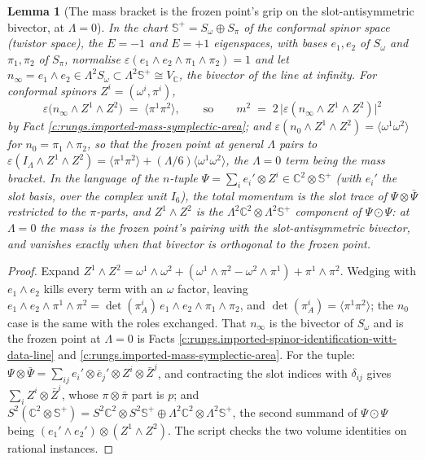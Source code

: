 \documentclass[11pt]{article}
\newtheorem{lemma}[theorem]{Lemma}
\theoremstyle{definition}
\theoremstyle{plain}
\providecommand{\C}{}\renewcommand{\C}{\mathbb{C}}
\providecommand{\CS}{}\renewcommand{\CS}{{\mathbb{S}^{+}}}
\providecommand{\Som}{}\renewcommand{\Som}{S_\omega}
\providecommand{\Spi}{}\renewcommand{\Spi}{S_\pi}
\providecommand{\br}{}\renewcommand{\br}[1]{\langle #1\rangle}
\begin{document}
\begin{lemma}[The mass bracket is the frozen point's grip on the slot-antisymmetric bivector, at $\Lambda = 0$]\label{c:rungs.mass-bracket-frozen-points-grip-slot}
In the chart $\CS = \Som \oplus \Spi$ of the conformal spinor space (twistor space), the $E = -1$ and $E = +1$ eigenspaces, with bases $e_{1}, e_{2}$ of $\Som$ and $\pi_{1}, \pi_{2}$ of $\Spi$, normalise $\varepsilon(e_{1} \wedge e_{2} \wedge \pi_{1} \wedge \pi_{2}) = 1$ and let $n_{\infty} = e_{1} \wedge e_{2} \in \Lambda^{2}\Som \subset \Lambda^{2}\CS \cong V_{\C}$, the bivector of the line at infinity. For conformal spinors $Z^{i} = (\omega^{i}, \pi^{i})$,
\[
\varepsilon\bigl(n_{\infty} \wedge Z^{1} \wedge Z^{2}\bigr) \;=\; \br{\pi^{1}\pi^{2}},
\qquad\text{so}\qquad
m^{2} \;=\; 2\,\bigl|\varepsilon(n_{\infty} \wedge Z^{1} \wedge Z^{2})\bigr|^{2}
\]
by Fact \ref{c:rungs.imported-mass-symplectic-area}; and $\varepsilon(n_{0} \wedge Z^{1} \wedge Z^{2}) = \br{\omega^{1}\omega^{2}}$ for $n_{0} = \pi_{1} \wedge \pi_{2}$, so that the frozen point at general $\Lambda$ pairs to $\varepsilon(I_{\Lambda} \wedge Z^{1} \wedge Z^{2}) = \br{\pi^{1}\pi^{2}} + (\Lambda/6)\br{\omega^{1}\omega^{2}}$, the $\Lambda = 0$ term being the mass bracket. In the language of the $n$-tuple $\Psi = \sum_{i} e_{i}' \otimes Z^{i} \in \C^{2} \otimes \CS$ (with $e_{i}'$ the slot basis, over the complex unit $I_{6}$), the total momentum is the slot trace of $\Psi \otimes \bar\Psi$ restricted to the $\pi$-parts, and $Z^{1} \wedge Z^{2}$ is the $\Lambda^{2}\C^{2} \otimes \Lambda^{2}\CS$ component of $\Psi \odot \Psi$: at $\Lambda = 0$ the mass is the frozen point's pairing with the slot-antisymmetric bivector, and vanishes exactly when that bivector is orthogonal to the frozen point.
\end{lemma}
\begin{proof}
Expand $Z^{1} \wedge Z^{2} = \omega^{1}\wedge\omega^{2} + (\omega^{1}\wedge\pi^{2} - \omega^{2}\wedge\pi^{1}) + \pi^{1}\wedge\pi^{2}$. Wedging with $e_{1} \wedge e_{2}$ kills every term with an $\omega$ factor, leaving $e_{1}\wedge e_{2}\wedge\pi^{1}\wedge\pi^{2} = \det(\pi^{i}_{A})\,e_{1}\wedge e_{2}\wedge\pi_{1}\wedge\pi_{2}$, and $\det(\pi^{i}_{A}) = \br{\pi^{1}\pi^{2}}$; the $n_{0}$ case is the same with the roles exchanged. That $n_{\infty}$ is the bivector of $\Som$ and is the frozen point at $\Lambda = 0$ is Facts \ref{c:rungs.imported-spinor-identification-witt-data-line} and \ref{c:rungs.imported-mass-symplectic-area}. For the tuple: $\Psi \otimes \bar\Psi = \sum_{ij} e_{i}' \otimes \bar e_{j}' \otimes Z^{i} \otimes \bar Z^{j}$, and contracting the slot indices with $\delta_{ij}$ gives $\sum_{i} Z^{i} \otimes \bar Z^{i}$, whose $\pi \otimes \bar\pi$ part is $p$; and $S^{2}(\C^{2} \otimes \CS) = S^{2}\C^{2} \otimes S^{2}\CS \oplus \Lambda^{2}\C^{2} \otimes \Lambda^{2}\CS$, the second summand of $\Psi \odot \Psi$ being $(e_{1}' \wedge e_{2}') \otimes (Z^{1} \wedge Z^{2})$. The script checks the two volume identities on rational instances.

\end{proof}
\end{document}
